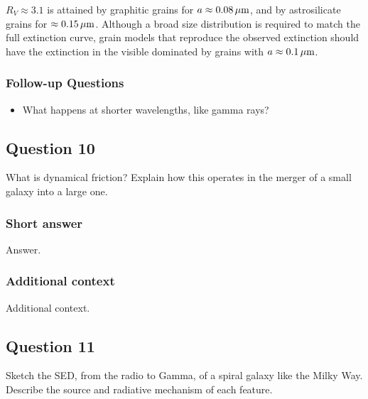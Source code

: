 \documentclass[a4paper,10pt]{article}
\begin{document}
{\noindent}$R_V\approx3.1$ is attained by graphitic grains for $a\approx0.08\,\mu{\rm m}$, and by astrosilicate grains for $\approx0.15\,\mu{\rm m}$. Although a broad size distribution is required to match the full extinction curve, grain models that reproduce the observed extinction should have the extinction in the visible dominated by grains with $a\approx0.1\,\mu{\rm m}$.


\subsubsection{Follow-up Questions}

\begin{itemize}
    \item What happens at shorter wavelengths, like gamma rays?
\end{itemize}


\newpage
\subsection{Question 10}

What is dynamical friction? Explain how this operates in the merger of a small galaxy into a large one.

\subsubsection{Short answer}

Answer.

\subsubsection{Additional context}

Additional context.


\newpage
\subsection{Question 11}

Sketch the SED, from the radio to Gamma, of a spiral galaxy like the Milky Way. Describe the source and radiative mechanism of each feature.
\end{document}
